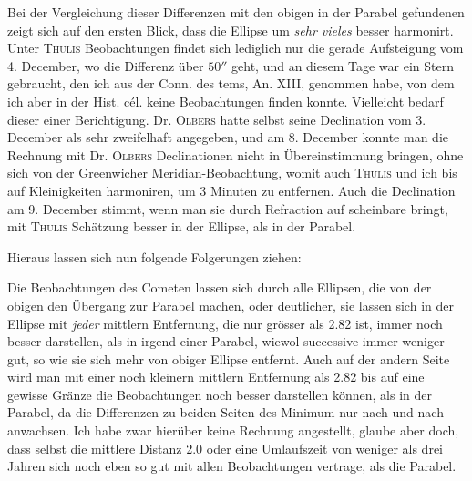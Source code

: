 %
\par\indent Bei der Vergleichung dieser Differenzen mit den obigen in der Parabel gefundenen
zeigt sich auf den ersten Blick, dass die Ellipse um \emph{sehr vieles} besser
harmonirt. Unter \textsc{Thulis} Beobachtungen findet sich lediglich nur die
gerade Aufsteigung vom 4. December, wo die Differenz über $50''$ geht, und an
diesem Tage war ein Stern gebraucht, den ich aus der Conn. des tems, An. XIII,
genommen habe, von dem ich aber in der Hist. cél. keine Beobachtungen finden
konnte. Vielleicht bedarf dieser einer Berichtigung. Dr. \textsc{Olbers} hatte
selbst seine Declination vom 3. December als sehr zweifelhaft angegeben, und am
8. December konnte man die Rechnung mit Dr. \textsc{Olbers} Declinationen nicht
in Übereinstimmung bringen, ohne sich von der Greenwicher Meridian-Beobachtung,
womit auch \textsc{Thulis} und ich bis auf Kleinigkeiten harmoniren, um 3
Minuten zu entfernen. Auch die Declination am 9. December stimmt, wenn man sie
durch Refraction auf scheinbare bringt, mit \textsc{Thulis} Schätzung besser in
der Ellipse, als in der Parabel.

\par\indent Hieraus lassen sich nun folgende Folgerungen ziehen:

\par\indent Die Beobachtungen des Cometen lassen sich durch alle Ellipsen, die von der
obigen den Übergang zur Parabel machen, oder deutlicher, sie lassen sich in der
Ellipse mit \emph{jeder} mittlern Entfernung, die nur grösser als 2.82 ist,
immer noch besser darstellen, als in irgend einer Parabel, wiewol successive
immer weniger gut, so wie sie sich mehr von obiger Ellipse entfernt. Auch auf
der andern Seite wird man mit einer noch kleinern mittlern Entfernung als 2.82
bis auf eine gewisse Gränze die Beobachtungen noch besser darstellen können,
als in der Parabel, da die Differenzen zu beiden Seiten des Minimum nur nach
und nach anwachsen. Ich habe zwar hierüber keine Rechnung angestellt, glaube
aber doch, dass selbst die mittlere Distanz 2.0 oder eine Umlaufszeit von
weniger als drei Jahren sich noch eben so gut mit allen Beobachtungen
vertrage, als die Parabel.

